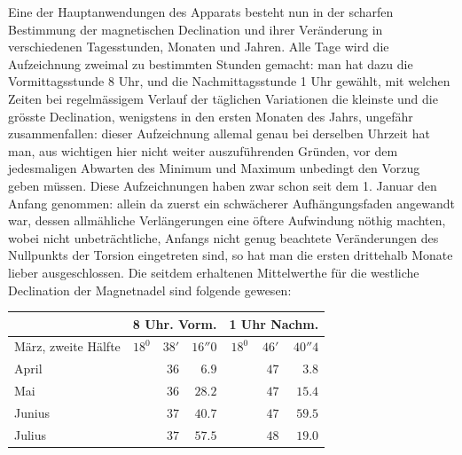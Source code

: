 Eine der Hauptanwendungen des Apparats besteht nun in der scharfen Bestimmung der magnetischen Declination und ihrer Veränderung in verschiedenen Tagesstunden, Monaten und Jahren. Alle Tage wird die Aufzeichnung zweimal zu bestimmten Stunden gemacht: man hat dazu die Vormittagsstunde 8 Uhr, und die Nachmittagsstunde 1 Uhr gewählt, mit welchen Zeiten bei regelmässigem Verlauf der täglichen Variationen die kleinste und die grösste Declination, wenigstens in den ersten Monaten des Jahrs, ungefähr zusammenfallen: dieser Aufzeichnung allemal genau bei derselben Uhrzeit hat man, aus wichtigen hier nicht weiter auszuführenden Gründen, vor dem jedesmaligen Abwarten des Minimum und Maximum unbedingt den Vorzug geben müssen. Diese Aufzeichnungen haben zwar schon seit dem 1. Januar den Anfang genommen: allein da zuerst ein schwächerer Aufhängungsfaden angewandt war, dessen allmähliche Verlängerungen eine öftere Aufwindung nöthig machten, wobei nicht unbeträchtliche, Anfangs nicht genug beachtete Veränderungen des Nullpunkts der Torsion eingetreten sind, so hat man die ersten drittehalb Monate lieber ausgeschlossen. Die seitdem erhaltenen Mittelwerthe für die westliche Declination der Magnetnadel sind folgende gewesen:
\begin{center}
\begin{tabular}{l|rrr|rrr}
 & \multicolumn{3}{c|}{8 Uhr. Vorm.} & \multicolumn{3}{c}{1 Uhr Nachm.}\\\hline
März, zweite Hälfte & $18^0$ & $38'$ & $16''0$ & $18^0$ & $46'$ & $40''4$\\
April & & $36$ & $6.9$ & & $47$ & $3.8$\\
Mai & & $36$ & $28.2$ & & $47$ & $15.4$\\
Junius & & $37$ & $40.7$ & & $47$ & $59.5$\\
Julius & & $37$ & $57.5$ & & $48$ & $19.0$
\end{tabular}
\end{center}

